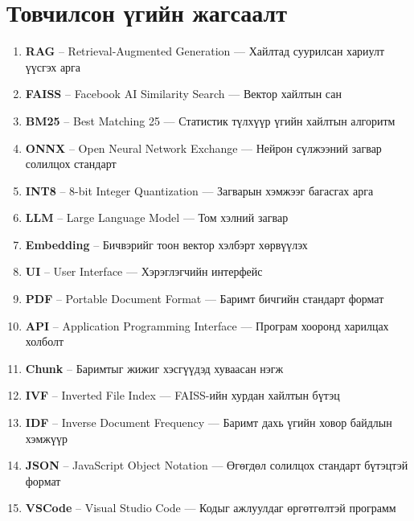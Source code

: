 \documentclass[11pt,a4paper]{article}
\begin{document}
\newpage
\tableofcontents

\newpage
\section*{Товчилсон үгийн жагсаалт}

\begin{enumerate}
    \item \textbf{RAG}       -- Retrieval-Augmented Generation — Хайлтад суурилсан хариулт үүсгэх арга
    \item \textbf{FAISS}     -- Facebook AI Similarity Search — Вектор хайлтын сан
    \item \textbf{BM25}      -- Best Matching 25 — Статистик түлхүүр үгийн хайлтын алгоритм
    \item \textbf{ONNX}      -- Open Neural Network Exchange — Нейрон сүлжээний загвар солилцох стандарт
    \item \textbf{INT8}      -- 8-bit Integer Quantization — Загварын хэмжээг багасгах арга
    \item \textbf{LLM}       -- Large Language Model — Том хэлний загвар
    \item \textbf{Embedding} -- Бичвэрийг тоон вектор хэлбэрт хөрвүүлэх
    \item \textbf{UI}        -- User Interface — Хэрэглэгчийн интерфейс
    \item \textbf{PDF}       -- Portable Document Format — Баримт бичгийн стандарт формат
    \item \textbf{API}       -- Application Programming Interface — Програм хооронд харилцах холболт
    \item \textbf{Chunk}     -- Баримтыг жижиг хэсгүүдэд хуваасан нэгж
    \item \textbf{IVF}       -- Inverted File Index — FAISS-ийн хурдан хайлтын бүтэц
    \item \textbf{IDF}       -- Inverse Document Frequency — Баримт дахь үгийн ховор байдлын хэмжүүр
    \item \textbf{JSON}      -- JavaScript Object Notation — Өгөгдөл солилцох стандарт бүтэцтэй формат
    \item \textbf{VSCode}    -- Visual Studio Code — Кодыг ажлуулдаг өргөтгөлтэй программ
\end{enumerate}

\newpage
{}
\listoftables
\end{document}
